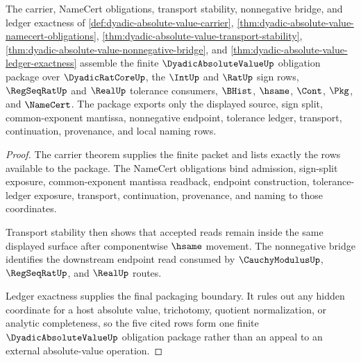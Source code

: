 \begin{theorem}
\label{thm:dyadic-absolute-value-obligation-closure-package}
The carrier, NameCert obligations, transport stability, nonnegative bridge, and ledger exactness of \autoref{def:dyadic-absolute-value-carrier}, \autoref{thm:dyadic-absolute-value-namecert-obligations}, \autoref{thm:dyadic-absolute-value-transport-stability}, \autoref{thm:dyadic-absolute-value-nonnegative-bridge}, and \autoref{thm:dyadic-absolute-value-ledger-exactness} assemble the finite $\DyadicAbsoluteValueUp$ obligation package over $\DyadicRatCoreUp$, the $\IntUp$ and $\RatUp$ sign rows, $\RegSeqRatUp$ and $\RealUp$ tolerance consumers, $\BHist$, $\hsame$, $\Cont$, $\Pkg$, and $\NameCert$. The package exports only the displayed source, sign split, common-exponent mantissa, nonnegative endpoint, tolerance ledger, transport, continuation, provenance, and local naming rows.
\end{theorem}
\begin{proof}
The carrier theorem supplies the finite packet and lists exactly the rows available to the package. The NameCert obligations bind admission, sign-split exposure, common-exponent mantissa readback, endpoint construction, tolerance-ledger exposure, transport, continuation, provenance, and naming to those coordinates.

Transport stability then shows that accepted reads remain inside the same displayed surface after componentwise $\hsame$ movement. The nonnegative bridge identifies the downstream endpoint read consumed by $\CauchyModulusUp$, $\RegSeqRatUp$, and $\RealUp$ routes.

Ledger exactness supplies the final packaging boundary. It rules out any hidden coordinate for a host absolute value, trichotomy, quotient normalization, or analytic completeness, so the five cited rows form one finite $\DyadicAbsoluteValueUp$ obligation package rather than an appeal to an external absolute-value operation.
\end{proof}

